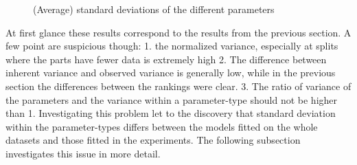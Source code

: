 \documentclass{scrartcl}
\begin{document}
\begin{figure}[h]
\centering
{}
\hspace{0mm}
\hspace{0mm}
\hspace{0mm}
\caption{(Average) standard deviations of the different parameters}
\label{fig:sds}
\end{figure}

At first glance these results correspond to the results from the previous section. A few point are suspicious though: 1. the normalized variance, especially at splits where the parts have fewer data is extremely high 2. The difference between inherent variance and observed variance is generally low, while in the previous section the differences between the rankings were clear. 3. The ratio of variance of the parameters and the variance within a parameter-type should not be higher than 1. Investigating this problem let to the discovery that standard deviation within the parameter-types differs between the models fitted on the whole datasets and those fitted in the experiments. The following subsection investigates this issue in more detail.
\end{document}
